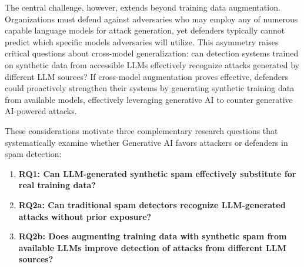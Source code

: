The central challenge, however, extends beyond training data augmentation. Organizations must defend against adversaries who may employ any of numerous capable language models for attack generation, yet defenders typically cannot predict which specific models adversaries will utilize. This asymmetry raises critical questions about cross-model generalization: can detection systems trained on synthetic data from accessible LLMs effectively recognize attacks generated by different LLM sources? If cross-model augmentation proves effective, defenders could proactively strengthen their systems by generating synthetic training data from available models, effectively leveraging generative AI to counter generative AI-powered attacks.

These considerations motivate three complementary research questions that systematically examine whether Generative AI favors attackers or defenders in spam detection:

\begin{enumerate}
    \item \textbf{RQ1: Can LLM-generated synthetic spam effectively substitute for real training data?}
    \item \textbf{RQ2a: Can traditional spam detectors recognize LLM-generated attacks without prior exposure?}
    \item \textbf{RQ2b: Does augmenting training data with synthetic spam from available LLMs improve detection of attacks from different LLM sources?}
\end{enumerate}

